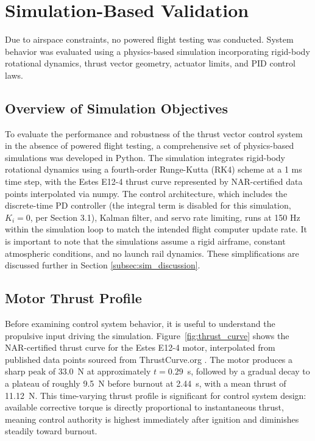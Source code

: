 \section{Simulation-Based Validation}
\label{sec:validation}

Due to airspace constraints, no powered flight testing was conducted. System behavior was evaluated
using a physics-based simulation incorporating rigid-body rotational dynamics, thrust vector geometry,
actuator limits, and PID control laws.

\subsection{Overview of Simulation Objectives}
\label{subsec:sim_objectives}

To evaluate the performance and robustness of the thrust vector control system in the absence of powered flight testing, a comprehensive set of physics-based simulations was developed in Python. The simulation integrates rigid-body rotational dynamics using a fourth-order Runge-Kutta (RK4) scheme at a 1 ms time step, with the Estes E12-4 thrust curve represented by NAR-certified data points interpolated via numpy. The control architecture, which includes the discrete-time PD controller (the integral term is disabled for this simulation, $K_i = 0$, per Section 3.1), Kalman filter, and servo rate limiting, runs at 150 Hz within the simulation loop to match the intended flight computer update rate. It is important to note that the simulations assume a rigid airframe, constant atmospheric conditions, and no launch rail dynamics. These simplifications are discussed further in Section \ref{subsec:sim_discussion}.


\subsection{Motor Thrust Profile}
\label{subsec:thrust_profile}

Before examining control system behavior, it is useful to understand the propulsive input driving
the simulation. Figure~\ref{fig:thrust_curve} shows the NAR-certified thrust curve for the Estes
E12-4 motor, interpolated from published data points sourced from ThrustCurve.org
\cite{nar_thrustcurve}. The motor produces a sharp peak of 33.0~N at approximately $t = 0.29$~s,
followed by a gradual decay to a plateau of roughly 9.5~N before burnout at 2.44~s, with a mean
thrust of 11.12~N. This time-varying thrust profile is significant for control system design:
available corrective torque is directly proportional to instantaneous thrust, meaning control
authority is highest immediately after ignition and diminishes steadily toward burnout.

